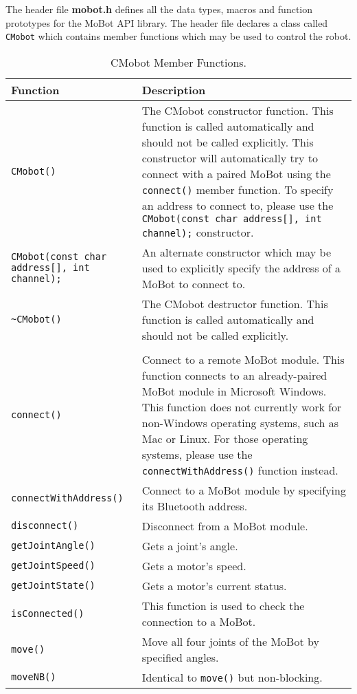 \noindent
The header file {\bf mobot.h} defines all the data types, macros 
and function prototypes for the MoBot API library. The header file
declares a class called \texttt{CMobot} which contains member functions which
may be used to control the robot.

\begin{table}[!h]
\begin{center}
\caption{CMobot Member Functions.}
\begin{tabular}{p{38 mm}p{77 mm}}
\hline
Function & Description \\
\hline
\texttt{CMobot()} & The CMobot constructor function. This function
is called automatically and should not be called explicitly. This constructor will 
automatically try to connect with a paired MoBot using the \texttt{connect()} member
function. To specify an address to connect to, please use the
\texttt{CMobot(const char address[], int channel);} constructor.\\
\texttt{CMobot(const char address[], int channel);} & 
An alternate constructor which may be used to explicitly specify the address of a MoBot 
to connect to. \\
\texttt{\textasciitilde CMobot()} & The CMobot destructor function. This function
is called automatically and should not be called explicitly. \\
& \\
\texttt{connect()} & Connect to a remote MoBot module. This function connects to an already-paired MoBot module in Microsoft Windows. This function does not currently work for non-Windows operating systems, such as Mac or Linux. For those operating systems, please use the \texttt{connectWithAddress()} function instead. \\
\texttt{connectWithAddress()} & Connect to a MoBot module by specifying its Bluetooth address. \\
\texttt{disconnect()} & Disconnect from a MoBot module. \\
\texttt{getJointAngle()} & Gets a joint's angle. \\
\texttt{getJointSpeed()} & Gets a motor's speed. \\
\texttt{getJointState()} & Gets a motor's current status. \\
\texttt{isConnected()} & This function is used to check the connection to a MoBot. \\
\texttt{move()} & Move all four joints of the MoBot by specified angles. \\
\texttt{moveNB()} & Identical to \texttt{move()} but non-blocking. \\
\hline
\end{tabular}
\end{center}
\label{mobilec_api_cbinary}
\end{table}


